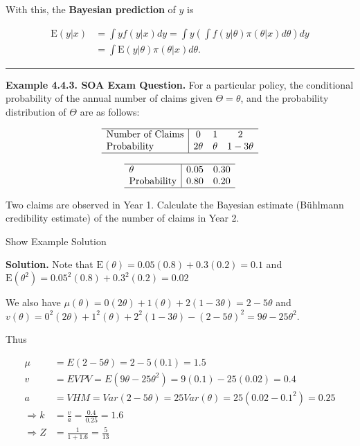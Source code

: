 \documentclass[]{book}
\theoremstyle{definition}
\theoremstyle{definition}
\theoremstyle{definition}
\theoremstyle{remark}
\begin{document}
With this, the \textbf{Bayesian prediction} of \(y\) is

\[\begin{aligned}
\mathrm{E}(y|x) &=  \int y f(y|x) dy = \int y \left(\int f(y|\theta) \pi(\theta|x) d\theta \right) dy \\
&=  \int  \mathrm{E}(y|\theta) \pi(\theta|x) d\theta .
\end{aligned}\]

\begin{center}\rule{0.5\linewidth}{\linethickness}\end{center}

\textbf{Example 4.4.3. SOA Exam Question.} For a particular policy, the
conditional probability of the annual number of claims given
\(\Theta = \theta\), and the probability distribution of \(\Theta\) are
as follows:

\[\begin{array}{l|ccc}
\hline
\text{Number of Claims} & 0 & 1 & 2 \\
\text{Probability} & 2\theta & \theta & 1-3\theta \\
\hline
\end{array}\]

\[\begin{array}{l|cc}
\hline
\theta & 0.05 & 0.30 \\
\text{Probability} & 0.80 & 0.20 \\
\hline
\end{array}\]

Two claims are observed in Year 1. Calculate the Bayesian estimate
(Bühlmann credibility estimate) of the number of claims in Year 2.

Show Example Solution

\hypertarget{toggleExampleSelect.4.3}{}
\textbf{Solution.} Note that
\(\mathrm{E}(\theta) = 0.05(0.8) + 0.3(0.2) = 0.1\) and
\(\mathrm{E}(\theta^2) = 0.05^2(0.8) + 0.3^2(0.2)=0.02\)

We also have
\(\mu(\theta) = 0(2\theta) + 1(\theta) + 2(1-3\theta) = 2-5\theta\) and
\(v(\theta) = 0^2(2\theta) + 1^2(\theta) + 2^2(1-3\theta) - (2-5\theta)^2 = 9\theta-25\theta^2\).

Thus

\[\begin{aligned}
\mu &=  E(2-5\theta) = 2-5(0.1) = 1.5 \\
v   &=  EVPV = E(9\theta - 25\theta^2)=9(0.1)-25(0.02)=0.4 \\
a &= VHM = Var(2-5\theta) = 25Var(\theta) = 25(0.02-0.1^2) = 0.25 \\
\Rightarrow k &= \frac{v}{a} = \frac{0.4}{0.25} = 1.6 \\
\Rightarrow Z &= \frac{1}{1+1.6} = \frac{5}{13}
\end{aligned}\]
\end{document}
